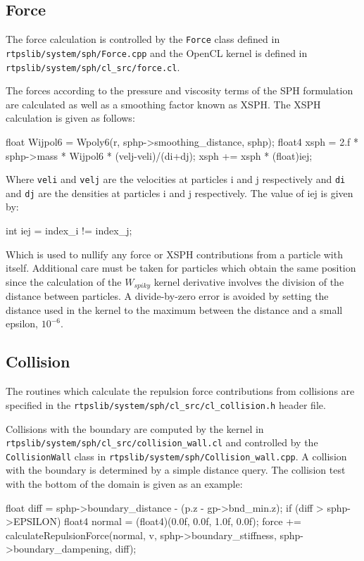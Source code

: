 \subsection{Force}
The force calculation is controlled by the \verb|Force| class defined in
\verb|rtpslib/system/sph/Force.cpp| and the OpenCL kernel is defined in
\verb|rtpslib/system/sph/cl_src/force.cl|. 


The forces according to the pressure and viscosity terms of the SPH formulation
are calculated as well as a smoothing factor known as XSPH.\cite{Krog} The XSPH
calculation is given as follows:

\begin{cppcode}{0}
    float Wijpol6 = Wpoly6(r, sphp->smoothing_distance, sphp);
    float4 xsph = 2.f * sphp->mass * Wijpol6 * (velj-veli)/(di+dj);
    xsph += xsph * (float)iej;
\end{cppcode}

Where \verb|veli| and \verb|velj| are the velocities at particles i and j
respectively and \verb|di| and \verb|dj| are the densities at particles i and j
respectively. The value of iej is given by:

\begin{cppcode}{0}
int iej = index_i != index_j;
\end{cppcode}

Which is used to nullify any force or XSPH contributions from a particle with
itself. Additional care must be taken for particles which obtain the same
position since the calculation of the $W_{spiky}$ kernel derivative involves
the division of the distance between particles. A divide-by-zero error is
avoided by setting the distance used in the kernel to the maximum between the
distance and a small epsilon, $10^{-6}$.


\subsection{Collision}
The routines which calculate the repulsion force contributions
from collisions are specified in the
\verb|rtpslib/system/sph/cl_src/cl_collision.h| header file.

Collisions with the boundary are computed by the kernel in
\\ \verb|rtpslib/system/sph/cl_src/collision_wall.cl| and controlled by the
\verb|CollisionWall| class in \verb|rtpslib/system/sph/Collision_wall.cpp|.
A collision with the boundary is determined by a simple distance query. The
collision test with the bottom of the domain is given as an example: 
\begin{cppcode}{0}
float diff = sphp->boundary_distance - (p.z - gp->bnd_min.z);
if (diff > sphp->EPSILON)
{
    float4 normal = (float4)(0.0f, 0.0f, 1.0f, 0.0f);
    force += calculateRepulsionForce(normal, v, sphp->boundary_stiffness, 
            sphp->boundary_dampening, diff);
}
\end{cppcode}

